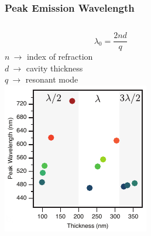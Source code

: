\documentclass{beamer}
\begin{document}
        
        \begin{frame}
            \frametitle{Peak Emission Wavelength}
            \begin{columns}
                \begin{column}{0.4\textwidth}
					\centering
					$$\lambda_0=\frac{2nd}{q}$$
					$n\ \rightarrow$ index of refraction\\
					$d\ \rightarrow$ cavity thickness\\
					$q\ \rightarrow$ resonant mode\\
					\includegraphics[width=\textwidth]{images/n1_peak_emission.png}
                \end{column}
                \begin{column}{0.6\textwidth}
					\centering

\end{column}
\end{columns}
\end{frame}
\end{document}
